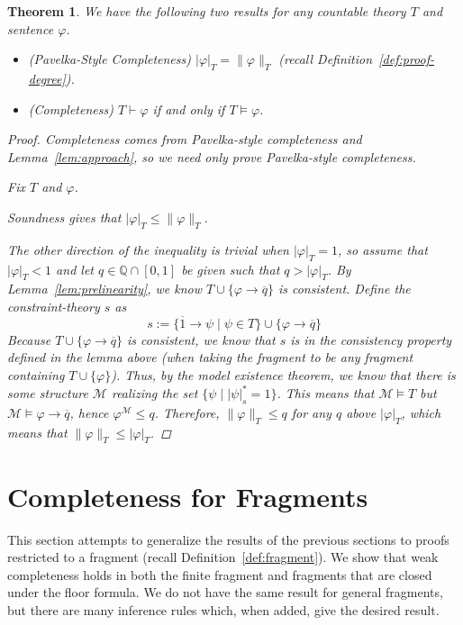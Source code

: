 \documentclass{amsart}
\newtheorem{theorem}{Theorem}[section]
\theoremstyle{definition}
\numberwithin{equation}{theorem}
\renewcommand{\phi}{\varphi}
\newcommand{\Q}{\mathbb{Q}}
\newcommand{\where}{\mid}
\newcommand{\proves}{\vdash}
\newcommand{\rat}[1]{{\overline{#1}}}
\newcommand{\narrow}[1]{\xrightarrow{#1}}
\renewcommand{\to}{\narrow{}}
\begin{document}
\begin{theorem}\label{thm:completeness}
  We have the following two results for any countable theory $T$ and sentence $\phi$.
  \begin{itemize}
  \item\emph{(Pavelka-Style Completeness)} $|\phi|_T=\|\phi\|_T$ \emph{(recall Definition~\ref{def:proof-degree})}.
  \item\emph{(Completeness)} $T\proves\phi$ if and only if $T\models\phi$.
  \end{itemize}
  \begin{proof}
    Completeness comes from Pavelka-style completeness and Lemma~\ref{lem:approach}, so we need only prove Pavelka-style completeness.
  
    Fix $T$ and $\phi$.
	
	  Soundness gives that $|\phi|_T\leq\|\phi\|_T$.
	  
	  The other direction of the inequality is trivial when $|\phi|_T=1$, so assume that $|\phi|_T<1$ and let $q\in\Q\cap[0,1]$ be given such that $q>|\phi|_T$.
	  By Lemma~\ref{lem:prelinearity}, we know $T\cup\{\phi\to\rat q\}$ is consistent.
	  Define the constraint-theory $s$ as
	  \[
	    s:=\{\rat 1\to\psi\where \psi\in T\}\cup\{\phi\to\rat q\}
	  \]
	  Because $T\cup\{\phi\to\rat q\}$ is consistent, we know that $s$ is in the consistency property defined in the lemma above (when taking the fragment to be any fragment containing $T\cup\{\phi\}$).
    Thus, by the model existence theorem, we know that there is some structure $\mathcal M$ realizing the set $\{\psi\where |\psi|^*_s=1\}$.
    This means that $\mathcal M\models T$ but $\mathcal M\models\phi\to\rat q$, hence $\phi^\mathcal M\leq q$.
    Therefore, $\|\phi\|_T\leq q$ for any $q$ above $|\phi|_T$, which means that $\|\phi\|_T\leq|\phi|_T$.
  \end{proof}
\end{theorem}

\section{Completeness for Fragments}
\newcommand{\caserule}{\text{\sc{Case}}}
This section attempts to generalize the results of the previous sections to proofs restricted to a fragment (recall Definition~\ref{def:fragment}).
We show that weak completeness holds in both the finite fragment and fragments that are closed under the floor formula.
We do not have the same result for general fragments, but there are many inference rules which, when added, give the desired result.
\end{document}
